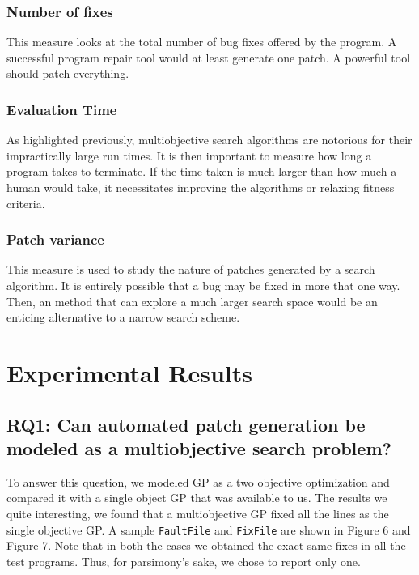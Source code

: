 \documentclass{sig-alternate}
\theoremstyle{break}
\begin{document}
\subsubsection{Number of fixes}

This measure looks at the total number of bug fixes offered by the program. A successful program repair tool would at least generate one patch. A powerful tool should patch everything.  

\subsubsection{Evaluation Time}

As highlighted previously, multiobjective search algorithms are notorious for their impractically large run times. It is then important to measure how long a program takes to terminate. If the time taken is much larger than how much a human would take, it necessitates improving the algorithms or relaxing fitness criteria.

\subsubsection{Patch variance}

This measure is used to study the nature of patches generated by a search algorithm. It is entirely possible that a bug may be fixed in more that one way. Then, an method that can explore a much larger search space would be an enticing alternative to a narrow search scheme.  

\section{Experimental Results}
\label{results}

\subsection*{RQ1: Can automated patch generation be modeled as a multiobjective search problem?}
To answer this question, we modeled GP as a two objective optimization and compared it with a single object GP that was available to us. The results we quite interesting, we found that a multiobjective GP fixed all the lines as the single objective GP. A sample \texttt{FaultFile} and \texttt{FixFile} are shown in Figure 6 and Figure 7. Note that in both the cases we obtained the exact same fixes in all the test programs. Thus, for parsimony's sake, we chose to report only one.
\end{document}
